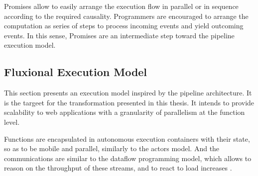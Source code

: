 Promises allow to easily arrange the execution flow in parallel or in sequence according to the required causality.
Programmers are encouraged to arrange the computation as series of steps to process incoming events and yield outcoming events.
In this sense, Promises are an intermediate step toward the pipeline execution model.



\subsection{Fluxional Execution Model} \label{chapter4:flx-model}

This section presents an execution model inspired by the pipeline architecture.
It is the targeet for the transformation presented in this thesis.
It intends to provide scalability to web applications with a granularity of parallelism at the function level.

Functions are encapsulated in autonomous execution containers with their state, so as to be mobile and parallel, similarly to the actors model.
And the communications are similar to the dataflow programming model, which allows to reason on the throughput of these streams, and to react to load increases \cite{Bartenstein2014}.

